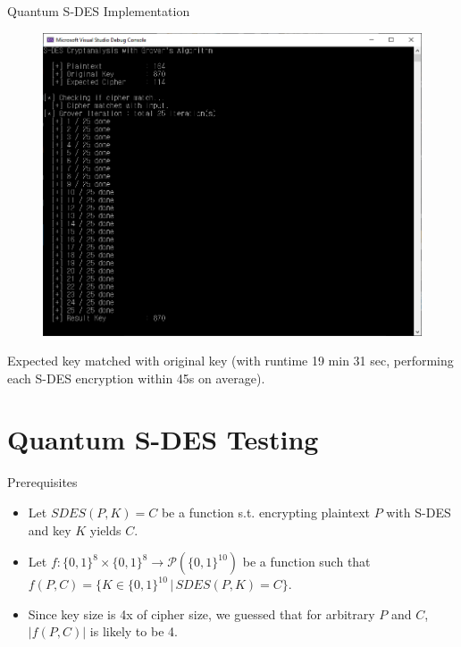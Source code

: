 \documentclass{beamer}
\begin{document}
    \begin{frame}{Quantum S-DES Implementation}
        \begin{figure}
            \centering
            \includegraphics[height=0.5\textheight]{./Images/Qsharp-SDES-Grover-k1.png}
        \end{figure}
        Expected key matched with original key (with runtime 19 min 31 sec, performing each S-DES encryption within 45s on average).
    \end{frame}

    \section{Quantum S-DES Testing}

    \begin{frame}{Prerequisites}
        \begin{itemize}
            \item Let $ SDES(P, K) = C $ be a function s.t. encrypting plaintext $ P $ with S-DES and key $ K $ yields $ C $.
            \item Let $ f : \{0, 1\}^8 \times \{0, 1\}^8 \to \mathcal{P}({\{0, 1\}^{10}})$ be a function such that $ f(P, C) = \{ K \in \{0, 1\}^{10} \,\vert\, SDES(P, K) = C\}$.
            \item Since key size is 4x of cipher size, we guessed that for arbitrary $ P $ and $ C $, $ \left\vert f(P, C) \right\vert$ is likely to be 4.
        \end{itemize}
    \end{frame}
\end{document}
